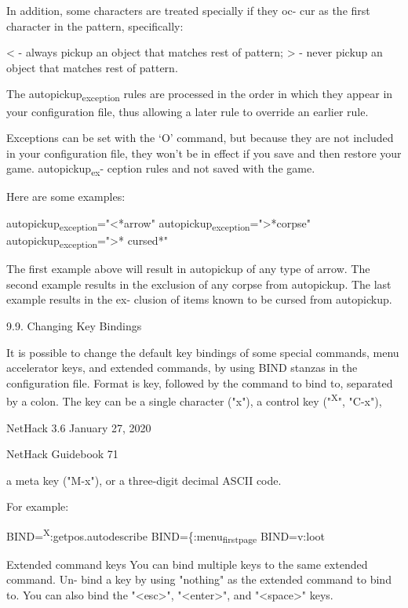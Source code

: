 \documentclass[11pt]{article}
\begin{document}
In addition, some characters are treated specially if they oc-
cur as the first character in the pattern, specifically:

< - always pickup an object that matches rest of pattern;
> - never pickup an object that matches rest of pattern.

The autopickup\textsubscript{exception} rules are processed in the order in
which they appear in your configuration file, thus allowing a
later rule to override an earlier rule.

Exceptions can be set with the `O' command, but because they
are not included in your configuration file, they won't be in
effect if you save and then restore your game.  autopickup\textsubscript{ex}-
ception rules and not saved with the game.

Here are some examples:

autopickup\textsubscript{exception}="<*arrow"
autopickup\textsubscript{exception}=">*corpse"
autopickup\textsubscript{exception}=">* cursed*"

   The first example above will result in autopickup of any
type of arrow. The second example results in the exclusion of
any corpse from autopickup. The last example results in the ex-
clusion of items known to be cursed from autopickup.

9.9. Changing Key Bindings

   It is possible to change the default key bindings of some
special commands, menu accelerator keys, and extended commands,
by using BIND stanzas in the configuration file. Format is key,
followed by the command to bind to, separated by a colon. The
key can be a single character ("x"), a control key ("\textsuperscript{X}", "C-x"),


NetHack 3.6                   January 27, 2020





NetHack Guidebook                       71



a meta key ("M-x"), or a three-digit decimal ASCII code.

For example:

BIND=\textsuperscript{X}:getpos.autodescribe
BIND=\{:menu\textsubscript{first}\textsubscript{page}
BIND=v:loot

Extended command keys
 You can bind multiple keys to the same extended command. Un-
 bind a key by using "nothing" as the extended command to bind
 to.  You can also bind the "<esc>", "<enter>", and "<space>"
 keys.
\end{document}
